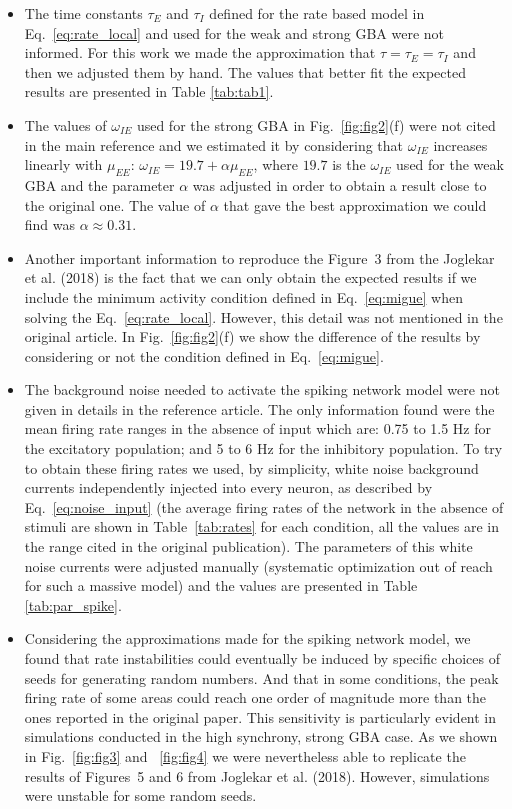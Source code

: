 \begin{itemize}
    \item The time constants $\tau_E$ and $\tau_I$ defined for the rate based model in  Eq.~\ref{eq:rate_local} and used for the weak and strong GBA were not informed. For this work we made the approximation that $\tau = \tau_E = \tau_I$ and then we adjusted them by hand. The values that better fit the expected results are presented in Table \ref{tab:tab1}.
    
    \item The values of $\omega_{IE}$ used for the strong GBA in Fig.~\ref{fig:fig2}(f) were not cited in the main reference and we estimated it by considering that $\omega_{IE}$ increases linearly with $\mu_{EE}$: $\omega_{IE}=19.7+\alpha\mu_{EE}$, where $19.7$ is the $\omega_{IE}$ used for the weak GBA and the parameter $\alpha$ was adjusted in order to obtain a result close to the original one. The value of $\alpha$ that gave the best approximation we could find was $\alpha \approx 0.31$.
    
    \item Another important information to reproduce the Figure~3 from the Joglekar et al. (2018) is the fact that we can only obtain the expected results if we include the minimum activity condition defined in Eq.~\ref{eq:migue} when solving the Eq.~\ref{eq:rate_local}. However, this detail was not mentioned in the original article. In Fig.~\ref{fig:fig2}(f) we show the difference of the results by considering or not the condition defined in Eq.~\ref{eq:migue}.
    
    \item The background noise needed to activate the spiking network model were not given in details in the reference article. The only information found were the mean firing rate ranges in the absence of input which are: 0.75 to 1.5 Hz for the excitatory population; and 5 to 6 Hz for the inhibitory population. To try to obtain these firing rates we used, by simplicity, white noise background currents independently injected into every neuron, as described by Eq.~\ref{eq:noise_input} (the average firing rates of the network in the absence of stimuli are shown in Table~\ref{tab:rates} for each condition, all the values are in the range cited in the original publication). The parameters of this white noise currents were adjusted manually (systematic optimization out of reach for such a massive model) and the values are presented in Table \ref{tab:par_spike}.  
    
    \item Considering the approximations made for the spiking network model, we found that rate instabilities could eventually be induced by specific choices of seeds for generating random numbers. And that in some conditions, the peak firing rate of some areas could reach one order of magnitude more than the ones reported in the original paper. This sensitivity is particularly evident in simulations conducted in the high synchrony, strong GBA case. As we shown in Fig.~\ref{fig:fig3} and ~\ref{fig:fig4} we were nevertheless able to replicate the results of Figures~5 and 6 from Joglekar et al. (2018). However, simulations were unstable for some random seeds.


\end{itemize}
